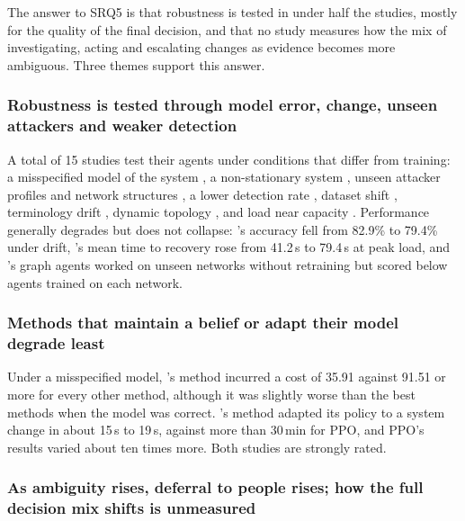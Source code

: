 \documentclass[pdflatex,sn-basic]{sn-jnl}
\begin{document}
The answer to SRQ5 is that robustness is tested in under half the studies, mostly for the quality of the final decision, and that no study measures how the mix of investigating, acting and escalating changes as evidence becomes more ambiguous. Three themes support this answer.

\subsubsection{Robustness is tested through model error, change, unseen attackers and weaker detection}

A total of 15 studies test their agents under conditions that differ from training: a misspecified model of the system \citep{hammar2025}, a non-stationary system \citep{hammar2026belief}, unseen attacker profiles and network structures \citep{ravi2025,nyberg2024,castro2025}, a lower detection rate \citep{contractor2025}, dataset shift \citep{sahin2026}, terminology drift \citep{peralta2025}, dynamic topology \citep{wu2026}, and load near capacity \citep{aenugu2026,kovtun2026}. Performance generally degrades but does not collapse: \citeauthor{peralta2025}'s \citeyearpar{peralta2025} accuracy fell from 82.9\% to 79.4\% under drift, \citeauthor{aenugu2026}'s \citeyearpar{aenugu2026} mean time to recovery rose from 41.2\,s to 79.4\,s at peak load, and \citeauthor{nyberg2024}'s \citeyearpar{nyberg2024} graph agents worked on unseen networks without retraining but scored below agents trained on each network.

\subsubsection{Methods that maintain a belief or adapt their model degrade least}

Under a misspecified model, \citeauthor{hammar2025}'s \citeyearpar{hammar2025} method incurred a cost of 35.91 against 91.51 or more for every other method, although it was slightly worse than the best methods when the model was correct. \citeauthor{hammar2026belief}'s \citeyearpar{hammar2026belief} method adapted its policy to a system change in about 15\,s to 19\,s, against more than 30\,min for PPO, and PPO's results varied about ten times more. Both studies are strongly rated.

\subsubsection{As ambiguity rises, deferral to people rises; how the full decision mix shifts is unmeasured}
\end{document}
